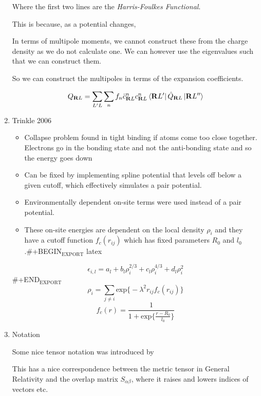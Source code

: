 \documentclass[11pt]{article}
\begin{document}
\begin{enumerate}
Where the first two lines are the \emph{Harris-Foulkes Functional}.

This is because, as a potential changes, 

In terms of multipole moments, we cannot construct these from the charge density as we do not calculate one. 
We can however use the eigenvalues such that we can construct them. 

So we can construct the multipoles in terms of the expansion coefficients. 

\begin{equation}
Q_{\mathbf{R}L} = \sum_{L'L} \sum_{n}  f_{n} \bar{c}_{\mathbf{R}L}^{n} c_{\mathbf{R}L}^{n} 
                        \bra{\mathbf{R}L'}\hat{Q}_{\mathbf{R}L}\ket{\mathbf{R}L''}
\end{equation}


\item Trinkle 2006
\label{sec:org5ab179a}
\begin{itemize}
\item Collapse problem found in tight binding if atoms come too close
together. Electrons go in the bonding state and not the anti-bonding
state and so the energy goes down
\item Can be fixed by implementing spline potential that levels off below a
given cutoff, which effectively simulates a pair potential.
\item Environmentally dependent on-site terms were used instead of a pair potential.
\item These on-site energies are dependent on the local density \(\rho_{i}\) and
they have a cutoff function \(f_{c}(r_{ij})\) which has fixed parameters
\(R_{0}\) and \(l_{0}\).\#+BEGIN\(_{\text{EXPORT}}\) latex
\end{itemize}
\begin{equation}
      \epsilon_{i,l} = a_{l} + b_{l}\rho_{i}^{2/3} + c_{l}\rho_{i}^{4/3} +
      d_{l}\rho_{i}^{2}\end{equation}
\#+END\(_{\text{EXPORT}}\) 
      \[ \rho_{i} = \sum_{j \neq i} \text{exp}\big\{ -\lambda^{2} r_{ij}
      f_{c}(r_{ij}) \big\} \]
      \[ f_{c}(r) = \frac{1}{1 + \text{exp}\Big\{  \frac{r-R_{0}}{l_{0}}\Big\}
      }\]

\item Notation
\label{sec:org6be9c85}

Some nice tensor notation was introduced by \cite{Ballentine1986}

This has a nice correspondence between the metric tensor in General Relativity
and the overlap matrix \(S_{\alpha\beta}\), where it raises and lowers indices
of vectors etc.
\end{enumerate}
\end{document}
